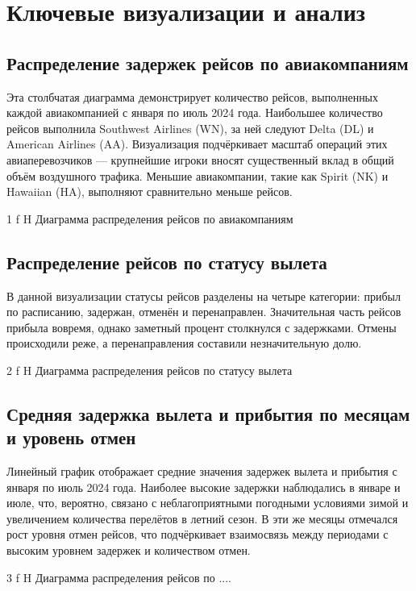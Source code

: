 \section{Ключевые визуализации и анализ}
\subsection{Распределение задержек рейсов по авиакомпаниям}

Эта столбчатая диаграмма демонстрирует количество рейсов, выполненных каждой авиакомпанией с января по июль 2024 года.
Наибольшее количество рейсов выполнила Southwest Airlines (WN), за ней следуют Delta (DL) и American Airlines (AA). Визуализация подчёркивает масштаб операций этих авиаперевозчиков — крупнейшие игроки вносят существенный вклад в общий объём воздушного трафика.
Меньшие авиакомпании, такие как Spirit (NK) и Hawaiian (HA), выполняют сравнительно меньше рейсов.

{1}
{f}
{H}
{\textwidth}
{Диаграмма распределения рейсов по авиакомпаниям}

\subsection{Распределение рейсов по статусу вылета}

В данной визуализации статусы рейсов разделены на четыре категории: прибыл по расписанию, задержан, отменён и перенаправлен.
Значительная часть рейсов прибыла вовремя, однако заметный процент столкнулся с задержками.
Отмены происходили реже, а перенаправления составили незначительную долю.

{2}
{f}
{H}
{\textwidth}
{Диаграмма распределения рейсов по статусу вылета}

\subsection{Средняя задержка вылета и прибытия по месяцам и уровень отмен}

Линейный график отображает средние значения задержек вылета и прибытия с января по июль 2024 года.
Наиболее высокие задержки наблюдались в январе и июле, что, вероятно, связано с неблагоприятными погодными условиями зимой и увеличением количества перелётов в летний сезон.
В эти же месяцы отмечался рост уровня отмен рейсов, что подчёркивает взаимосвязь между периодами с высоким уровнем задержек и количеством отмен.

{3}
{f}
{H}
{\textwidth}
{Диаграмма распределения рейсов по .... }

